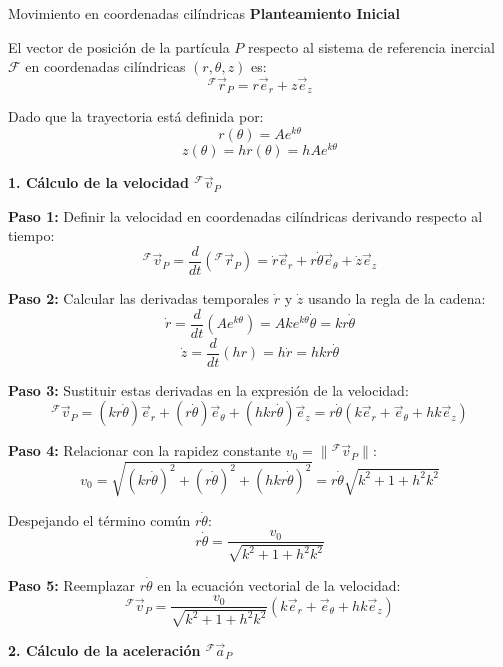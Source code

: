 \begin{solucion}{Movimiento en coordenadas cilíndricas}
\textbf{Planteamiento Inicial}

El vector de posición de la partícula $P$ respecto al sistema de referencia inercial $\mathcal{F}$ en coordenadas cilíndricas $(r, \theta, z)$ es:
\[
{}^{\mathcal{F}}\vec{r}_{P} = r \vec{e}_r + z \vec{e}_z
\]

Dado que la trayectoria está definida por:
\[
r(\theta) = A e^{k\theta}
\]
\[
z(\theta) = h r(\theta) = h A e^{k\theta}
\]

\vspace{0.5cm}

\noindent\textbf{1. Cálculo de la velocidad ${}^{\mathcal{F}}\vec{v}_{P}$}

\textbf{Paso 1:} Definir la velocidad en coordenadas cilíndricas derivando respecto al tiempo:
\[
{}^{\mathcal{F}}\vec{v}_{P} = \frac{d}{dt}\left({}^{\mathcal{F}}\vec{r}_{P}\right) = \dot{r}\vec{e}_r + r\dot{\theta}\vec{e}_\theta + \dot{z}\vec{e}_z
\]

\textbf{Paso 2:} Calcular las derivadas temporales $\dot{r}$ y $\dot{z}$ usando la regla de la cadena:
\[
\dot{r} = \frac{d}{dt}\left(A e^{k\theta}\right) = A k e^{k\theta}\dot{\theta} = k r \dot{\theta}
\]
\[
\dot{z} = \frac{d}{dt}\left(h r\right) = h \dot{r} = h k r \dot{\theta}
\]

\textbf{Paso 3:} Sustituir estas derivadas en la expresión de la velocidad:
\[
{}^{\mathcal{F}}\vec{v}_{P} = (k r \dot{\theta})\vec{e}_r + (r \dot{\theta})\vec{e}_\theta + (h k r \dot{\theta})\vec{e}_z = r \dot{\theta} \left( k \vec{e}_r + \vec{e}_\theta + h k \vec{e}_z \right)
\]

\textbf{Paso 4:} Relacionar con la rapidez constante $v_0 = \|{}^{\mathcal{F}}\vec{v}_{P}\|$:
\[
v_0 = \sqrt{(k r \dot{\theta})^2 + (r \dot{\theta})^2 + (h k r \dot{\theta})^2} = r \dot{\theta} \sqrt{k^2 + 1 + h^2 k^2}
\]

Despejando el término común $r \dot{\theta}$:
\[
r \dot{\theta} = \frac{v_0}{\sqrt{k^2 + 1 + h^2 k^2}}
\]

\textbf{Paso 5:} Reemplazar $r\dot{\theta}$ en la ecuación vectorial de la velocidad:
\[
{}^{\mathcal{F}}\vec{v}_{P} = \frac{v_0}{\sqrt{k^2 + 1 + h^2 k^2}} \left( k \vec{e}_r + \vec{e}_\theta + h k \vec{e}_z \right)
\]

\vspace{0.5cm}

\noindent\textbf{2. Cálculo de la aceleración ${}^{\mathcal{F}}\vec{a}_{P}$}


\end{solucion}
